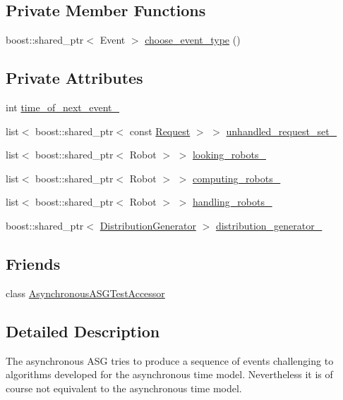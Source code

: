 \subsection*{Private Member Functions}
\begin{CompactItemize}
\item 
boost::shared\_\-ptr$<$ Event $>$ \hyperlink{class_asynchronous_a_s_g_a8a58e515bb574cc93682d8821682e73}{choose\_\-event\_\-type} ()
\end{CompactItemize}
\subsection*{Private Attributes}
\begin{CompactItemize}
\item 
int \hyperlink{class_asynchronous_a_s_g_2dd36f7979292fdc273a49f0f7fdd6c2}{time\_\-of\_\-next\_\-event\_\-}
\item 
list$<$ boost::shared\_\-ptr$<$ const \hyperlink{class_request}{Request} $>$ $>$ \hyperlink{class_asynchronous_a_s_g_1c00f0cf10435b21e1b3ceb7a1150d6b}{unhandled\_\-request\_\-set\_\-}
\item 
list$<$ boost::shared\_\-ptr$<$ Robot $>$ $>$ \hyperlink{class_asynchronous_a_s_g_1fd277bf5ad58672320c9822197d6109}{looking\_\-robots\_\-}
\item 
list$<$ boost::shared\_\-ptr$<$ Robot $>$ $>$ \hyperlink{class_asynchronous_a_s_g_6e47fd6b84daae67217cb3ca0b09e390}{computing\_\-robots\_\-}
\item 
list$<$ boost::shared\_\-ptr$<$ Robot $>$ $>$ \hyperlink{class_asynchronous_a_s_g_f65d4f1de454809c7e7fcd44699d49e8}{handling\_\-robots\_\-}
\item 
boost::shared\_\-ptr$<$ \hyperlink{class_distribution_generator}{DistributionGenerator} $>$ \hyperlink{class_asynchronous_a_s_g_e5ccdc6beb099e9f243868b31bf66452}{distribution\_\-generator\_\-}
\end{CompactItemize}
\subsection*{Friends}
\begin{CompactItemize}
\item 
class \hyperlink{class_asynchronous_a_s_g_9fbe3b2400008b3dab55bea0e55a5332}{AsynchronousASGTestAccessor}
\end{CompactItemize}


\subsection{Detailed Description}
The asynchronous ASG tries to produce a sequence of events challenging to algorithms developed for the asynchronous time model. Nevertheless it is of course not equivalent to the asynchronous time model. 

